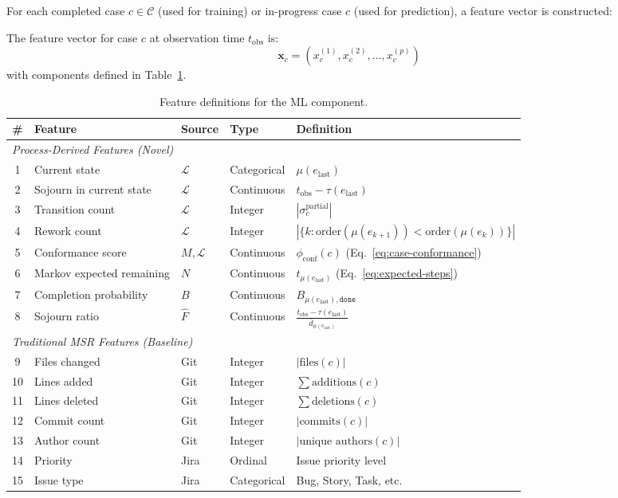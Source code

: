 For each completed case $c \in \mathcal{C}$ (used for training) or 
in-progress case $c$ (used for prediction), a feature vector is 
constructed:

\begin{definition}
\label{def:feature-vector}
The feature vector for case $c$ at observation time $t_{\text{obs}}$ is:
\begin{equation}
\label{eq:feature-vector}
\mathbf{x}_c = \left( x_c^{(1)}, x_c^{(2)}, \ldots, x_c^{(p)} \right)
\end{equation}
with components defined in Table~\ref{tab:features}.
\end{definition}

\begin{table}[htbp]
\centering
\caption{Feature definitions for the ML component.}
\label{tab:features}
\small
\begin{tabular}{cllll}
\toprule
\textbf{\#} & \textbf{Feature} & \textbf{Source} & \textbf{Type} & \textbf{Definition} \\
\midrule
\multicolumn{5}{l}{\textit{Process-Derived Features (Novel)}} \\
\midrule
1 & Current state & $\mathcal{L}$ & Categorical & $\mu(e_{\text{last}})$ \\
2 & Sojourn in current state & $\mathcal{L}$ & Continuous & $t_{\text{obs}} - \tau(e_{\text{last}})$ \\
3 & Transition count & $\mathcal{L}$ & Integer & $|\sigma_c^{\text{partial}}|$ \\
4 & Rework count & $\mathcal{L}$ & Integer & $|\{k : \text{order}(\mu(e_{k+1})) < \text{order}(\mu(e_k))\}|$ \\
5 & Conformance score & $M, \mathcal{L}$ & Continuous & $\phi_{\text{conf}}(c)$ (Eq.~\ref{eq:case-conformance}) \\
6 & Markov expected remaining & $N$ & Continuous & $t_{\mu(e_{\text{last}})}$ (Eq.~\ref{eq:expected-steps}) \\
7 & Completion probability & $B$ & Continuous & $B_{\mu(e_{\text{last}}), \texttt{done}}$ \\
8 & Sojourn ratio & $\hat{F}$ & Continuous & $\frac{t_{\text{obs}} - \tau(e_{\text{last}})}{\bar{d}_{\mu(e_{\text{last}})}}$ \\
\midrule
\multicolumn{5}{l}{\textit{Traditional MSR Features (Baseline)}} \\
\midrule
9 & Files changed & Git & Integer & $|\text{files}(c)|$ \\
10 & Lines added & Git & Integer & $\sum \text{additions}(c)$ \\
11 & Lines deleted & Git & Integer & $\sum \text{deletions}(c)$ \\
12 & Commit count & Git & Integer & $|\text{commits}(c)|$ \\
13 & Author count & Git & Integer & $|\text{unique authors}(c)|$ \\
14 & Priority & Jira & Ordinal & Issue priority level \\
15 & Issue type & Jira & Categorical & Bug, Story, Task, etc. \\
\bottomrule
\end{tabular}
\end{table}

